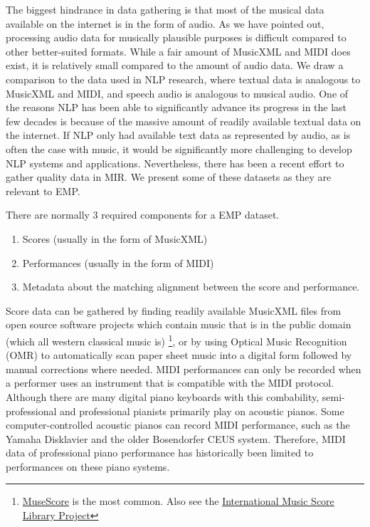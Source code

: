 The biggest hindrance in data gathering is that most of the musical data available on the internet is in the form of audio. As we have pointed out, processing audio data for musically plausible purposes is difficult compared to other better-suited formats. While a fair amount of MusicXML and MIDI does exist, it is relatively small compared to the amount of audio data. We draw a comparison to the data used in NLP research, where textual data is analogous to MusicXML and MIDI, and speech audio is analogous to musical audio. One of the reasons NLP has been able to significantly advance its progress in the last few decades is because of the massive amount of readily available textual data on the internet. If NLP only had available text data as represented by audio, as is often the case with music, it would be significantly more challenging to develop NLP systems and applications. Nevertheless, there has been a recent effort to gather quality data in MIR. We present some of these datasets as they are relevant to EMP. 

There are normally 3 required components for a EMP dataset. 
\begin{enumerate}
    \item Scores (usually in the form of MusicXML)
    \item Performances (usually in the form of MIDI)
    \item Metadata about the matching alignment between the score and performance. 
\end{enumerate}
Score data can be gathered by finding readily available MusicXML files from open source software projects which contain music that is in the public domain (which all western classical music is) \footnote{\href{https://musescore.com}{MuseScore} is the most common. Also see the \href{https://imslp.org/wiki/Main_Page}{International Music Score Library Project}}, or by using Optical Music Recognition (OMR) to automatically scan paper sheet music into a digital form followed by manual corrections where needed. MIDI performances can only be recorded when a performer uses an instrument that is compatible with the MIDI protocol. Although there are many digital piano keyboards with this combability, semi-professional and professional pianists primarily play on acoustic pianos. Some computer-controlled acoustic pianos can record MIDI performance, such as the Yamaha Disklavier and the older Bosendorfer CEUS system. Therefore, MIDI data of professional piano performance has historically been limited to performances on these piano systems. 

